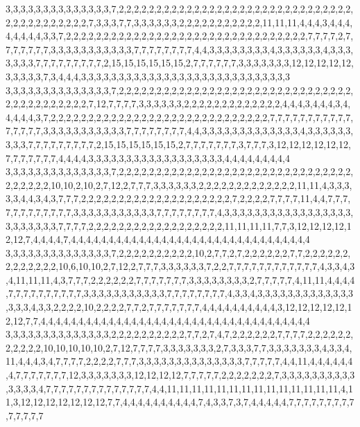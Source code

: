 3,3,3,3,3,3,3,3,3,3,3,3,3,3,7,2,2,2,2,2,2,2,2,2,2,2,2,2,2,2,2,2,2,2,2,2,2,2,2,2,2,2,2,2,2,2,2,2,2,2,2,2,2,2,2,2,2,7,3,3,3,7,7,3,3,3,3,3,3,2,2,2,2,2,2,2,2,2,2,2,11,11,11,4,4,4,3,4,4,4,4,4,4,4,4,3,3,7,2,2,2,2,2,2,2,2,2,2,2,2,2,2,2,2,2,2,2,2,2,2,2,2,2,2,2,2,2,2,2,2,7,7,7,7,2,7,7,7,7,7,7,7,3,3,3,3,3,3,3,3,3,3,3,7,7,7,7,7,7,7,7,4,4,3,3,3,3,3,3,3,3,4,3,3,3,3,3,3,4,3,3,3,3,3,3,3,7,7,7,7,7,7,7,7,7,2,15,15,15,15,15,15,2,7,7,7,7,7,7,3,3,3,3,3,3,3,12,12,12,12,12,3,3,3,3,3,7,3,4,4,4,3,3,3,3,3,3,3,3,3,3,3,3,3,3,3,3,3,3,3,3,3,3,3,3,3,3,3,3
3,3,3,3,3,3,3,3,3,3,3,3,3,3,7,2,2,2,2,2,2,2,2,2,2,2,2,2,2,2,2,2,2,2,2,2,2,2,2,2,2,2,2,2,2,2,2,2,2,2,2,2,2,2,2,2,2,7,12,7,7,7,7,3,3,3,3,3,3,2,2,2,2,2,2,2,2,2,2,2,2,2,4,4,4,3,4,4,4,3,4,4,4,4,4,3,7,2,2,2,2,2,2,2,2,2,2,2,2,2,2,2,2,2,2,2,2,2,2,2,2,2,2,2,2,2,7,7,7,7,7,7,7,7,7,7,7,7,7,7,7,7,3,3,3,3,3,3,3,3,3,3,3,7,7,7,7,7,7,7,7,4,4,3,3,3,3,3,3,3,3,3,3,3,3,3,4,3,3,3,3,3,3,3,3,3,7,7,7,7,7,7,7,7,7,2,15,15,15,15,15,15,2,7,7,7,7,7,7,7,3,7,7,7,3,12,12,12,12,12,12,7,7,7,7,7,7,7,4,4,4,4,3,3,3,3,3,3,3,3,3,3,3,3,3,3,3,3,3,3,4,4,4,4,4,4,4,4,4
3,3,3,3,3,3,3,3,3,3,3,3,3,3,7,2,2,2,2,2,2,2,2,2,2,2,2,2,2,2,2,2,2,2,2,2,2,2,2,2,2,2,2,2,2,2,2,2,2,2,2,2,10,10,2,10,2,7,12,2,7,7,7,3,3,3,3,3,3,2,2,2,2,2,2,2,2,2,2,2,2,2,11,11,4,3,3,3,3,3,4,4,3,4,3,7,7,7,2,2,2,2,2,2,2,2,2,2,2,2,2,2,2,2,2,2,2,2,7,2,2,2,2,7,7,7,7,11,4,4,7,7,7,7,7,7,7,7,7,7,7,7,3,3,3,3,3,3,3,3,3,3,3,7,7,7,7,7,7,7,7,4,3,3,3,3,3,3,3,3,3,3,3,3,3,3,3,3,3,3,3,3,3,3,3,3,7,7,7,7,2,2,2,2,2,2,2,2,2,2,2,2,2,2,2,2,2,2,11,11,11,11,7,7,3,12,12,12,12,12,12,7,4,4,4,4,7,4,4,4,4,4,4,4,4,4,4,4,4,4,4,4,4,4,4,4,4,4,4,4,4,4,4,4,4,4,4,4,4
3,3,3,3,3,3,3,3,3,3,3,3,3,3,7,2,2,2,2,2,2,2,2,2,2,10,2,7,7,2,7,2,2,2,2,2,2,7,7,2,2,2,2,2,2,2,2,2,2,2,2,2,10,6,10,10,2,7,12,2,7,7,7,3,3,3,3,3,3,7,2,2,7,7,7,7,7,7,7,7,7,7,7,7,4,3,3,4,3,4,11,11,11,4,3,7,7,7,2,2,2,2,2,2,7,7,7,7,7,7,7,3,3,3,3,3,3,3,3,2,7,7,7,7,7,4,11,11,4,4,4,4,7,7,7,7,7,7,7,7,7,7,3,3,3,3,3,3,3,3,3,3,3,7,7,7,7,7,7,7,7,4,3,3,4,3,3,3,3,3,3,3,3,3,3,3,3,3,3,3,3,4,3,3,2,2,2,2,10,2,2,2,2,7,7,2,7,7,7,7,7,7,7,4,4,4,4,4,4,4,4,4,4,3,12,12,12,12,12,12,12,7,7,4,4,4,4,4,4,4,4,4,4,4,4,4,4,4,4,4,4,4,4,4,4,4,4,4,4,4,4,4,4,4,4,4,4,4,4
3,3,3,3,3,3,3,3,3,3,3,3,3,3,2,2,2,2,2,2,2,2,2,2,7,7,2,7,4,7,2,2,2,2,2,2,7,7,7,7,2,2,2,2,2,2,2,2,2,2,2,10,10,10,10,10,2,7,12,7,7,7,7,3,3,3,3,3,3,3,2,7,3,3,3,7,7,3,3,3,3,3,3,3,4,3,3,4,11,4,4,4,3,4,7,7,7,7,2,2,2,2,7,7,7,3,3,3,3,3,3,3,3,3,3,3,3,3,3,7,7,7,7,7,4,4,11,4,4,4,4,4,4,4,7,7,7,7,7,7,7,12,3,3,3,3,3,3,3,12,12,12,12,7,7,7,7,7,2,2,2,2,2,2,2,7,3,3,3,3,3,3,3,3,3,3,3,3,3,3,4,7,7,7,7,7,7,7,7,7,7,7,7,7,7,4,4,11,11,11,11,11,11,11,11,11,11,11,11,11,11,4,11,3,12,12,12,12,12,12,12,7,7,4,4,4,4,4,4,4,4,4,4,7,4,3,3,7,3,7,4,4,4,4,4,7,7,7,7,7,7,7,7,7,7,7,7,7,7
